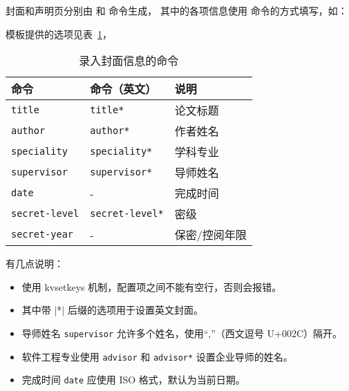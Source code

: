 \documentclass[a4paper]{ltxdoc}
\DeclareRobustCommand\pkg{\textsf}
\DeclareRobustCommand\opt{\texttt}
\begin{document}
\DescribeMacro{\maketitle}
\DescribeMacro{\copyrightpage}
封面和声明页分别由  和  命令生成，
其中的各项信息使用  命令的方式填写，如：
\begin{latex}
\end{latex}
模板提供的选项见表~\ref{tab:covercmds}，
\begin{table}[htb]
  \centering\small
  \caption{录入封面信息的命令}
  \label{tab:covercmds}
  \begin{tabular}{lll}
    \toprule
    命令               & 命令（英文）        & 说明          \\
    \midrule
    \opt{title}        & \opt{title*}        & 论文标题      \\
    \opt{author}       & \opt{author*}       & 作者姓名      \\
    \opt{speciality}   & \opt{speciality*}   & 学科专业      \\
    \opt{supervisor}   & \opt{supervisor*}   & 导师姓名      \\
    \opt{date}         & -                   & 完成时间      \\
    \opt{secret-level} & \opt{secret-level*} & 密级          \\
    \opt{secret-year}  & -                   & 保密/控阅年限 \\
    \bottomrule
  \end{tabular}
\end{table}

有几点说明：
\begin{itemize}
  \item {} 使用 \pkg{kvsetkeys} 机制，配置项之间不能有空行，否则会报错。
  \item 其中带 |*| 后缀的选项用于设置英文封面。
  \item 导师姓名 \opt{supervisor} 允许多个姓名，使用“,”（西文逗号 U+002C）隔开。
  \item 软件工程专业使用 \opt{advisor} 和 \opt{advisor*} 设置企业导师的姓名。
  \item 完成时间 \opt{date} 应使用 ISO 格式，默认为当前日期。
\end{itemize}
\end{document}
